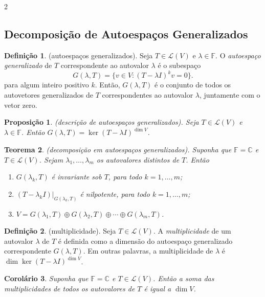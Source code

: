 \documentclass{article}
\theoremstyle{plain}
\newtheorem{thm}{Teorema}[section]
\newtheorem{prop}[thm]{Proposição}
\newtheorem{cor}[thm]{Corolário}
\theoremstyle{definition}
\newtheorem{defn}{Definição}[section]
\theoremstyle{remark}
\begin{document}
\begin{multicols}{2}
\subsection{Decomposição de Autoespaços Generalizados}

\begin{defn} (autoespaços generalizados).
    Seja \(T \in \mathcal{L}(V)\) e \(\lambda \in \mathbb{F}\). O \emph{autoespaço generalizado} de \(T\) correspondente ao autovalor \(\lambda\) é o subespaço
    \[
        G(\lambda, T) = \{v \in V : (T - \lambda I)^k v = 0\}.
    \]
    \noindent para algum inteiro positivo \(k\). Então, \(G(\lambda, T)\) é o conjunto de todos os autovetores generalizados de \(T\) correspondentes ao autovalor \(\lambda\), juntamente com o vetor zero.
\end{defn}

\begin{prop} (descrição de autoespaços generalizados).
    Seja \(T \in \mathcal{L}(V)\) e \(\lambda \in \mathbb{F}\). Então \(G(\lambda, T) = \ker (T - \lambda I)^{\dim V}\).
\end{prop}

\begin{thm} (decomposição em autoespaços generalizados).
    Suponha que \(\mathbb{F} = \mathbb{C}\) e \(T \in \mathcal{L}(V)\). Sejam \(\lambda_1, \ldots, \lambda_m\) os autovalores distintos de \(T\). Então
    \begin{enumerate}
        \item [\textup{(a)}] \(G(\lambda_k, T)\) é invariante sob \(T\), para todo \(k = 1, \ldots, m\);
        \item [\textup{(b)}] \((T - \lambda_k I)|_{G(\lambda_k, T)}\) é nilpotente, para todo \(k = 1, \ldots, m\);
        \item [\textup{(c)}] \(V = G(\lambda_1, T) \oplus G(\lambda_2, T) \oplus \cdots \oplus G(\lambda_m, T)\).
    \end{enumerate}
\end{thm}

\begin{defn} (multiplicidade).
    Seja \(T \in \mathcal{L}(V)\). A \emph{multiplicidade} de um autovalor \(\lambda\) de \(T\) é definida como a dimensão do autoespaço generalizado correspondente \(G(\lambda, T)\). Em outras palavras, a multiplicidade de \(\lambda\) é \(\dim \ker (T - \lambda I)^{\dim V}\).
\end{defn}

\begin{cor}
    Suponha que \(\mathbb{F} = \mathbb{C}\) e \(T \in \mathcal{L}(V)\). Então a soma das multiplicidades de todos os autovalores de \(T\) é igual a \(\dim V\).
\end{cor}


\end{multicols}
\end{document}
